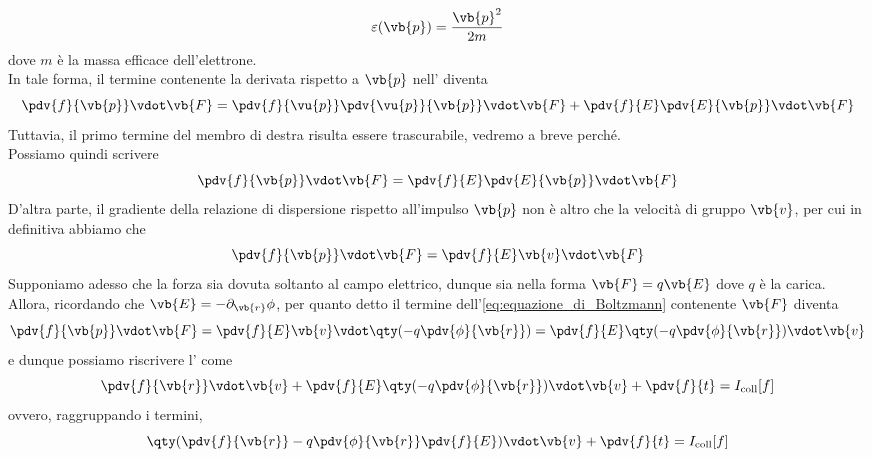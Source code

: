 \begin{equation*}
    \varepsilon(\vb{p})=
    \frac{\vb{p}^2}{2m}
\end{equation*}
dove $m$ è la massa efficace dell'elettrone.\\
In tale forma, il termine contenente la derivata rispetto a $\vb{p}$ nell' diventa
\begin{equation*}
    \pdv{f}{\vb{p}} \vdot \vb{F}
    =\pdv{f}{\vu{p}} \pdv{\vu{p}}{\vb{p}} \vdot \vb{F} + \pdv{f}{E} \pdv{E}{\vb{p}}\vdot \vb{F} 
\end{equation*}
Tuttavia, il primo termine del membro di destra risulta essere trascurabile, vedremo a breve perché.\\
Possiamo quindi scrivere
\begin{equation*}
    \pdv{f}{\vb{p}} \vdot \vb{F}
    =\pdv{f}{E} \pdv{E}{\vb{p}}\vdot \vb{F}
\end{equation*}
D'altra parte, il gradiente della relazione di dispersione rispetto all'impulso $\vb{p}$ non è altro che la velocità di gruppo $\vb{v}$, per cui in definitiva abbiamo che
\begin{equation*}
    \pdv{f}{\vb{p}} \vdot \vb{F}
    =\pdv{f}{E} \vb{v} \vdot \vb{F}
\end{equation*}
Supponiamo adesso che la forza sia dovuta soltanto al campo elettrico, dunque sia nella forma $\vb{F}=q\vb{E}$ dove $q$ è la carica. Allora, ricordando che $\vb{E}=-\partial_{\vb{r}} \phi$, per quanto detto il termine dell'\eqref{eq:equazione_di_Boltzmann} contenente $\vb{F}$ diventa
\begin{equation*}
    \pdv{f}{\vb{p}} \vdot \vb{F}
    =\pdv{f}{E} \vb{v} \vdot \qty( -q \pdv{\phi}{\vb{r}} )
    =\pdv{f}{E} \qty( -q \pdv{\phi}{\vb{r}} ) \vdot \vb{v}
\end{equation*}
e dunque possiamo riscrivere l' come
\begin{equation*}
    \pdv{f}{\vb{r}} \vdot \vb{v} + \pdv{f}{E} \qty( -q \pdv{\phi}{\vb{r}} ) \vdot \vb{v} + \pdv{f}{t}
    =I_{\rm coll}[f]
\end{equation*}
ovvero, raggruppando i termini,
\begin{equation}
    \qty( \pdv{f}{\vb{r}} - q \pdv{\phi}{\vb{r}} \pdv{f}{E} ) \vdot \vb{v} + \pdv{f}{t}
    =I_{\rm coll}[f]
    \label{eq:equazione_di_Boltzmann_con_campo}
\end{equation}
